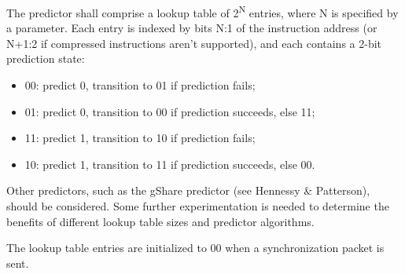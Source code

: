 The predictor shall comprise a lookup table of 2\textsuperscript{N} entries, where N is specified by a parameter.  
Each entry is indexed by bits N:1 of the instruction address (or N+1:2 if compressed instructions aren't supported), 
and each contains a 2-bit prediction state:
\begin{itemize}
  \item 00: predict 0, transition to 01 if prediction fails;
  \item 01: predict 0, transition to 00 if prediction succeeds, else 11;
  \item 11: predict 1, transition to 10 if prediction fails;
  \item 10: predict 1, transition to 11 if prediction succeeds, else 00.
\end{itemize}

Other predictors, such as the gShare predictor (see Hennessy \& Patterson), should be considered.  Some further
experimentation is needed to determine the benefits of different lookup table sizes and predictor algorithms.

The lookup table entries are initialized to 00 when a synchronization packet is sent.

